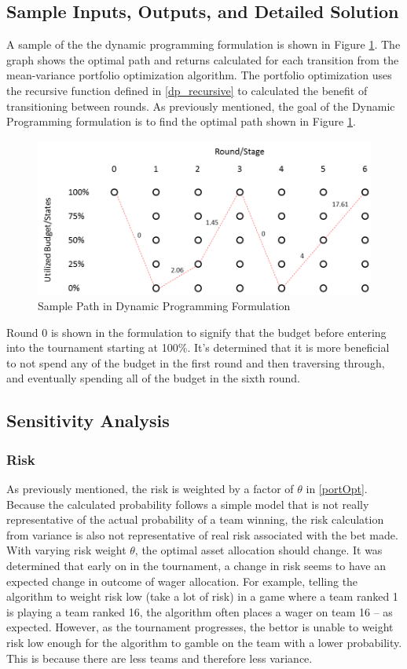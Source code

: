 \documentclass[12pt]{article}
\begin{document}
\subsection{Sample Inputs, Outputs, and Detailed Solution}
A sample of the the dynamic programming formulation is shown in Figure \ref{sampleDP}.
The graph shows the optimal path and returns calculated for each transition from the mean-variance portfolio optimization algorithm.
The portfolio optimization uses the recursive function defined in \eqref{dp_recursive} to calculated the benefit of transitioning between rounds.
As previously mentioned, the goal of the Dynamic Programming formulation is to find the optimal path shown in Figure \ref{sampleDP}.
\begin{figure}[H]
\centering
	\includegraphics[scale=.5]{sampleDP.png}%
	\caption{Sample Path in Dynamic Programming Formulation}
	\label{sampleDP}
\end{figure}
Round 0 is shown in the formulation to signify that the budget before entering into the tournament starting at 100\%.
It's determined that it is more beneficial to not spend any of the budget in the first round and then traversing through, and eventually spending all of the budget in the sixth round.

\subsection{Sensitivity Analysis}
\subsubsection{Risk}
As previously mentioned, the risk is weighted by a factor of $\theta$ in \eqref{portOpt}.
Because the calculated probability follows a simple model that is not really representative of the actual probability of a team winning, the risk calculation from variance is also not representative of real risk associated with the bet made. 
With varying risk weight $\theta$, the optimal asset allocation should change. 
It was determined that early on in the tournament, a change in risk seems to have an expected change in outcome of wager allocation.
For example, telling the algorithm to weight risk low (take a lot of risk) in a game where a team ranked 1 is playing a team ranked 16, the algorithm often places a wager on team 16 -- as expected.
However, as the tournament progresses, the bettor is unable to weight risk low enough for the algorithm to gamble on the team with a lower probability.
This is because there are less teams and therefore less variance.
\end{document}
